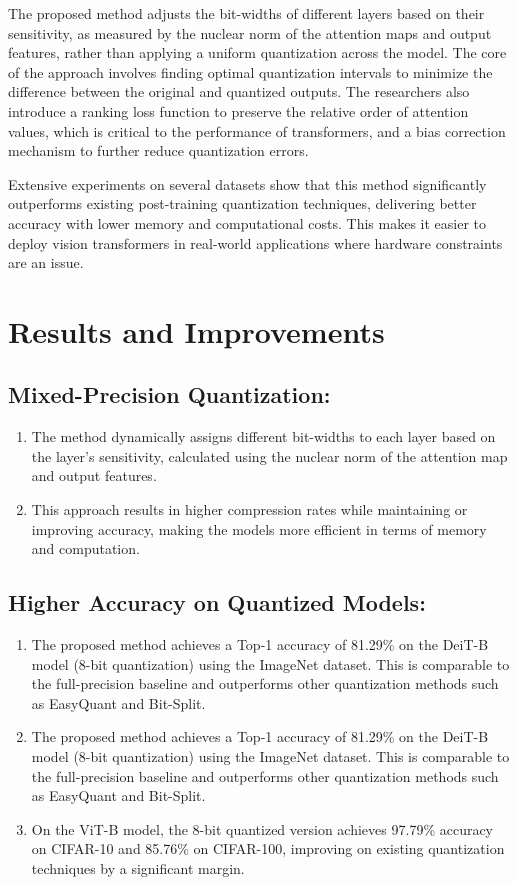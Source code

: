 \documentclass{report}
\begin{document}
	
	The proposed method adjusts the bit-widths of different layers based on their sensitivity, as measured by the nuclear norm of the attention maps and output features, rather than applying a uniform quantization across the model. The core of the approach involves finding optimal quantization intervals to minimize the difference between the original and quantized outputs. The researchers also introduce a ranking loss function to preserve the relative order of attention values, which is critical to the performance of transformers, and a bias correction mechanism to further reduce quantization errors.
	
	
	Extensive experiments on several datasets show that this method significantly outperforms existing post-training quantization techniques, delivering better accuracy with lower memory and computational costs. This makes it easier to deploy vision transformers in real-world applications where hardware constraints are an issue.
	
	
	
	\section{Results and Improvements}
	\subsection{Mixed-Precision Quantization:}
	\begin{enumerate}
		\item 
		The method dynamically assigns different bit-widths to each layer based on the layer’s sensitivity, calculated using the nuclear norm of the attention map and output features.
		
		\item 
		This approach results in higher compression rates while maintaining or improving accuracy, making the models more efficient in terms of memory and computation.
	\end{enumerate}
	
	\subsection{Higher Accuracy on Quantized Models:}
	\begin{enumerate}
		\item 
		The proposed method achieves a Top-1 accuracy of 81.29\% on the DeiT-B model (8-bit quantization) using the ImageNet dataset. This is comparable to the full-precision baseline and outperforms other quantization methods such as EasyQuant and Bit-Split.
		
		\item 
		The proposed method achieves a Top-1 accuracy of 81.29\% on the DeiT-B model (8-bit quantization) using the ImageNet dataset. This is comparable to the full-precision baseline and outperforms other quantization methods such as EasyQuant and Bit-Split.
		
		\item 
		On the ViT-B model, the 8-bit quantized version achieves 97.79\% accuracy on CIFAR-10 and 85.76\% on CIFAR-100, improving on existing quantization techniques by a significant margin.
	\end{enumerate}
	
\end{document}
